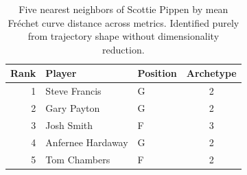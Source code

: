 \begin{table}[htbp]
  \centering\small
  \begin{tabular}{rllc}
    \toprule
    Rank & Player & Position & Archetype \\
    \midrule
    1 & Steve Francis & G & 2 \\
    2 & Gary Payton & G & 2 \\
    3 & Josh Smith & F & 3 \\
    4 & Anfernee Hardaway & G & 2 \\
    5 & Tom Chambers & F & 2 \\
    \bottomrule
  \end{tabular}
  \caption{Five nearest neighbors of Scottie Pippen by mean Fr\'{e}chet curve distance across metrics. Identified purely from trajectory shape without dimensionality reduction.}
  \label{tab:Scottie_Pippen_frechet_curve_neighbors}
\end{table}

